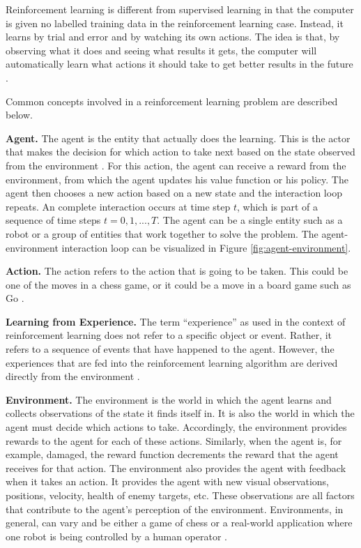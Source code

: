 Reinforcement learning is different from supervised learning in that the computer is given no labelled training data in the reinforcement learning case. Instead, it learns by trial and error and by watching its own actions. The idea is that, by observing what it does and seeing what results it gets, the computer will automatically learn what actions it should take to get better results in the future \cite{sutton2018reinforcement}.

Common concepts involved in a reinforcement learning problem are described below.



\textbf{Agent.}
The agent is the entity that actually does the learning. This is the actor that makes the decision for which action to take next based on the state observed from the environment \cite{sutton2018reinforcement}. For this action, the agent can receive a reward from the environment, from which the agent updates his value function or his policy. The agent then chooses a new action based on a new state and the interaction loop repeats. An complete interaction occurs at time step $t$, which is part of a sequence of time steps $t = 0, 1, ..., T$. 
The agent can be a single entity such as a robot or a group of entities that work together to solve the problem. The agent-environment interaction loop can be visualized in Figure \ref{fig:agent-environment}. 




\textbf{Action.}
The action refers to the action that is going to be taken. This could be one of the moves in a chess game, or it could be a move in a board game such as Go \cite{sutton2018reinforcement}.

\textbf{Learning from Experience.} The term “experience” as used in the context of reinforcement learning does not refer to a specific object or event. Rather, it refers to a sequence of events that have happened to the agent. However, the experiences that are fed into the reinforcement learning algorithm are derived directly from the environment \cite{sutton2018reinforcement}.

\textbf{Environment.}
The environment is the world in which the agent learns and collects observations of the state it finds itself in. It is also the world in which the agent must decide which actions to take. Accordingly, the environment provides rewards to the agent for each of these actions. Similarly, when the agent is, for example, damaged, the reward function decrements the reward that the agent receives for that action. The environment also provides the agent with feedback when it takes an action. It provides the agent with new visual observations, positions, velocity, health of enemy targets, etc. These observations are all factors that contribute to the agent’s perception of the environment. Environments, in general, can vary and be either a game of chess or a real-world application where one robot is being controlled by a human operator \cite{sutton2018reinforcement}.


